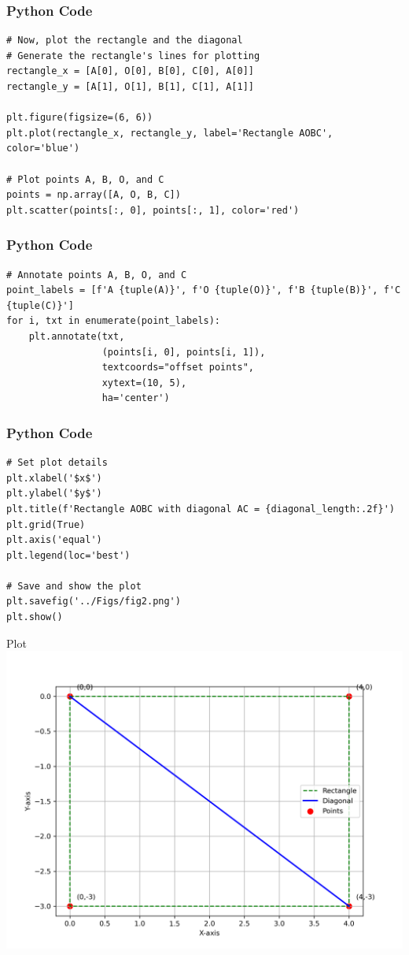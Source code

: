 \documentclass{beamer}
\begin{document}
\begin{frame}[fragile]
    \frametitle{Python Code}
    \begin{lstlisting}
# Now, plot the rectangle and the diagonal
# Generate the rectangle's lines for plotting
rectangle_x = [A[0], O[0], B[0], C[0], A[0]]
rectangle_y = [A[1], O[1], B[1], C[1], A[1]]

plt.figure(figsize=(6, 6))
plt.plot(rectangle_x, rectangle_y, label='Rectangle AOBC', color='blue')

# Plot points A, B, O, and C
points = np.array([A, O, B, C])
plt.scatter(points[:, 0], points[:, 1], color='red')
\end{lstlisting}
\end{frame}

\begin{frame}[fragile]
    \frametitle{Python Code}
    \begin{lstlisting}
# Annotate points A, B, O, and C
point_labels = [f'A {tuple(A)}', f'O {tuple(O)}', f'B {tuple(B)}', f'C {tuple(C)}']
for i, txt in enumerate(point_labels):
    plt.annotate(txt,
                 (points[i, 0], points[i, 1]),
                 textcoords="offset points",
                 xytext=(10, 5),
                 ha='center')
\end{lstlisting}
\end{frame}

\begin{frame}[fragile]
    \frametitle{Python Code}
    \begin{lstlisting}
# Set plot details
plt.xlabel('$x$')
plt.ylabel('$y$')
plt.title(f'Rectangle AOBC with diagonal AC = {diagonal_length:.2f}')
plt.grid(True)
plt.axis('equal')
plt.legend(loc='best')

# Save and show the plot
plt.savefig('../Figs/fig2.png')
plt.show()
\end{lstlisting}
\end{frame}

 \begin{frame}{Plot}
    \centering
    \includegraphics[width=\columnwidth, height=0.8\textheight, keepaspectratio]{../Figs/fig2.png}     
\end{frame}
\end{document}
